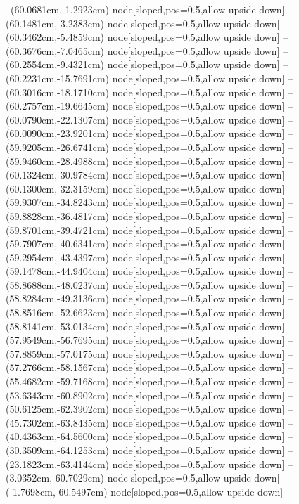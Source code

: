--(60.0681cm,-1.2923cm) node[sloped,pos=0.5,allow upside down]{\ArrowIn}
--(60.1481cm,-3.2383cm) node[sloped,pos=0.5,allow upside down]{\ArrowIn}
--(60.3462cm,-5.4859cm) node[sloped,pos=0.5,allow upside down]{\ArrowIn}
--(60.3676cm,-7.0465cm) node[sloped,pos=0.5,allow upside down]{\ArrowIn}
--(60.2554cm,-9.4321cm) node[sloped,pos=0.5,allow upside down]{\ArrowIn}
--(60.2231cm,-15.7691cm) node[sloped,pos=0.5,allow upside down]{\ArrowIn}
--(60.3016cm,-18.1710cm) node[sloped,pos=0.5,allow upside down]{\ArrowIn}
--(60.2757cm,-19.6645cm) node[sloped,pos=0.5,allow upside down]{\ArrowIn}
--(60.0790cm,-22.1307cm) node[sloped,pos=0.5,allow upside down]{\ArrowIn}
--(60.0090cm,-23.9201cm) node[sloped,pos=0.5,allow upside down]{\ArrowIn}
--(59.9205cm,-26.6741cm) node[sloped,pos=0.5,allow upside down]{\ArrowIn}
--(59.9460cm,-28.4988cm) node[sloped,pos=0.5,allow upside down]{\ArrowIn}
--(60.1324cm,-30.9784cm) node[sloped,pos=0.5,allow upside down]{\ArrowIn}
--(60.1300cm,-32.3159cm) node[sloped,pos=0.5,allow upside down]{\ArrowIn}
--(59.9307cm,-34.8243cm) node[sloped,pos=0.5,allow upside down]{\ArrowIn}
--(59.8828cm,-36.4817cm) node[sloped,pos=0.5,allow upside down]{\ArrowIn}
--(59.8701cm,-39.4721cm) node[sloped,pos=0.5,allow upside down]{\ArrowIn}
--(59.7907cm,-40.6341cm) node[sloped,pos=0.5,allow upside down]{\ArrowIn}
--(59.2954cm,-43.4397cm) node[sloped,pos=0.5,allow upside down]{\ArrowIn}
--(59.1478cm,-44.9404cm) node[sloped,pos=0.5,allow upside down]{\ArrowIn}
--(58.8688cm,-48.0237cm) node[sloped,pos=0.5,allow upside down]{\ArrowIn}
--(58.8284cm,-49.3136cm) node[sloped,pos=0.5,allow upside down]{\ArrowIn}
--(58.8516cm,-52.6623cm) node[sloped,pos=0.5,allow upside down]{\ArrowIn}
--(58.8141cm,-53.0134cm) node[sloped,pos=0.5,allow upside down]{\arrowIn}
--(57.9549cm,-56.7695cm) node[sloped,pos=0.5,allow upside down]{\ArrowIn}
--(57.8859cm,-57.0175cm) node[sloped,pos=0.5,allow upside down]{\arrowIn}
--(57.2766cm,-58.1567cm) node[sloped,pos=0.5,allow upside down]{\ArrowIn}
--(55.4682cm,-59.7168cm) node[sloped,pos=0.5,allow upside down]{\ArrowIn}
--(53.6343cm,-60.8902cm) node[sloped,pos=0.5,allow upside down]{\ArrowIn}
--(50.6125cm,-62.3902cm) node[sloped,pos=0.5,allow upside down]{\ArrowIn}
--(45.7302cm,-63.8435cm) node[sloped,pos=0.5,allow upside down]{\ArrowIn}
--(40.4363cm,-64.5600cm) node[sloped,pos=0.5,allow upside down]{\ArrowIn}
--(30.3509cm,-64.1253cm) node[sloped,pos=0.5,allow upside down]{\ArrowIn}
--(23.1823cm,-63.4144cm) node[sloped,pos=0.5,allow upside down]{\ArrowIn}
--(3.0352cm,-60.7029cm) node[sloped,pos=0.5,allow upside down]{\ArrowIn}
--(-1.7698cm,-60.5497cm) node[sloped,pos=0.5,allow upside down]{\ArrowIn}
